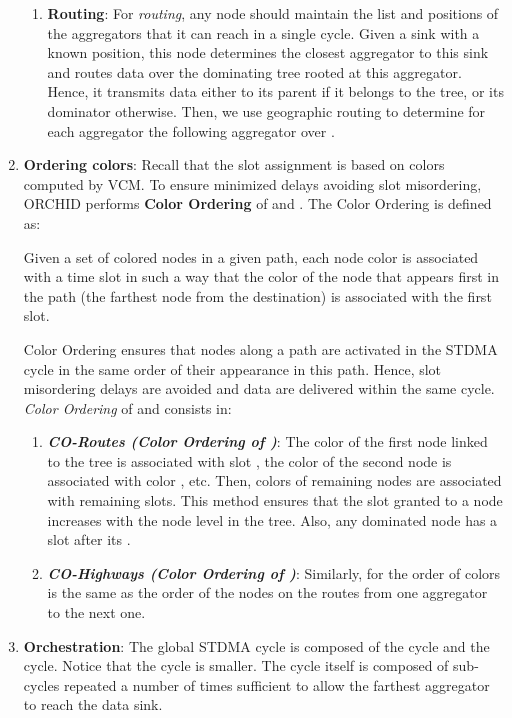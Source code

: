 \begin{enumerate}
\begin{enumerate}
\item \textbf{Routing}: 
For \textit{routing}, any node should maintain the list and positions of the aggregators that it can reach in a single cycle. Given a sink with a known position, this node determines the closest aggregator to this sink and routes data over the dominating tree rooted at this aggregator. Hence, it transmits data either to its parent if it belongs to the tree, or its dominator otherwise.
Then, we use geographic routing to determine for each aggregator the following aggregator over .
\end{enumerate}
\item \textbf{Ordering colors}:
Recall that the slot assignment is based on colors computed by VCM. To ensure minimized delays avoiding slot misordering, ORCHID performs \textbf{Color Ordering} of  and . The Color Ordering is defined as:
\begin{definition}
Given a set of colored nodes in a given path, each node color is associated with a time slot in such a way that the color of the node that appears first in the path (the farthest node from the destination) is associated with the first slot. 
\end{definition}
Color Ordering ensures that nodes along a path are activated in the STDMA cycle in the same order of their appearance in this path. Hence, slot misordering delays are avoided and data are delivered within the same cycle.
\textit{Color Ordering} of  and  consists in:
\begin{enumerate}
\item \textbf{\textit{CO-Routes (Color Ordering of )}}: 
The color of the first node linked to the tree is associated with slot , the color of the second node is associated with color , etc. Then, colors of remaining nodes are associated with remaining slots.
This method ensures that the slot granted to a node increases with the node level in the tree. Also, any dominated node has a slot after its .


\item \textbf{\textit{CO-Highways (Color Ordering of )}}: Similarly, for  the order of colors is the same as the order of the nodes on the routes from one aggregator to the next one. 
\end{enumerate}

\item \textbf{Orchestration}:
The global STDMA cycle is composed of the  cycle and the  cycle. Notice that the  cycle is smaller. The  cycle itself is composed of sub-cycles repeated a number of times sufficient to allow the farthest aggregator to reach the data sink.

\end{enumerate}



